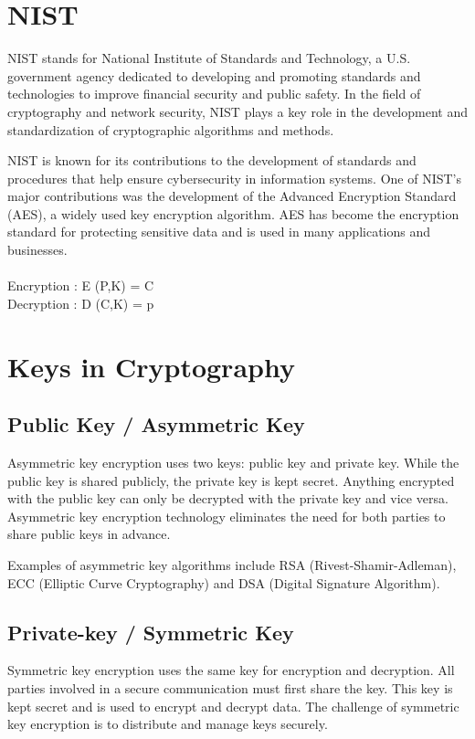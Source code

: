 \documentclass[11pt]{article}
\begin{document}
\section{NIST}
NIST stands for National Institute of Standards and Technology, a U.S. government agency dedicated to developing and promoting standards and technologies to improve financial security and public safety. In the field of cryptography and network security, NIST plays a key role in the development and standardization of cryptographic algorithms and methods.

NIST is known for its contributions to the development of standards and procedures that help ensure cybersecurity in information systems. One of NIST's major contributions was the development of the Advanced Encryption Standard (AES), a widely used key encryption algorithm. AES has become the encryption standard for protecting sensitive data and is used in many applications and businesses.
\\\\
Encryption : E (P,K) = C\\
Decryption : D (C,K) = p
\\
\section{Keys in Cryptography}
\subsection{Public Key / Asymmetric Key} 
Asymmetric key encryption uses two keys: public key and private key. While the public key is shared publicly, the private key is kept secret. Anything encrypted with the public key can only be decrypted with the private key and vice versa. Asymmetric key encryption technology eliminates the need for both parties to share public keys in advance.

Examples of asymmetric key algorithms include RSA (Rivest-Shamir-Adleman), ECC (Elliptic Curve Cryptography) and DSA (Digital Signature Algorithm).

\subsection{Private-key / Symmetric Key}
Symmetric key encryption uses the same key for encryption and decryption. All parties involved in a secure communication must first share the key. This key is kept secret and is used to encrypt and decrypt data. The challenge of symmetric key encryption is to distribute and manage keys securely.
\end{document}
